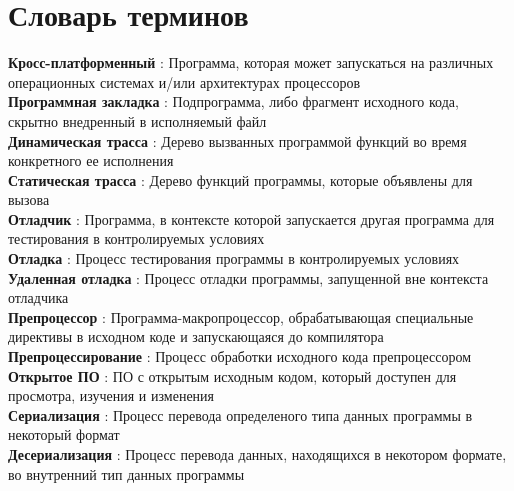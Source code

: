 \chapter*{Словарь терминов}             %

\textbf{Кросс-платформенный} : Программа, которая может запускаться на различных операционных системах и/или архитектурах процессоров \\
\textbf{Программная закладка} : Подпрограмма, либо фрагмент исходного кода, скрытно внедренный в исполняемый файл \\
\textbf{Динамическая трасса} : Дерево вызванных программой функций во время конкретного ее исполнения \\
\textbf{Статическая трасса} : Дерево функций программы, которые объявлены для вызова \\
\textbf{Отладчик} : Программа, в контексте которой запускается другая программа для тестирования в контролируемых условиях \\
\textbf{Отладка} : Процесс тестирования программы в контролируемых условиях \\
\textbf{Удаленная отладка} : Процесс отладки программы, запущенной вне контекста отладчика \\
\textbf{Препроцессор} : Программа-макропроцессор, обрабатывающая специальные директивы в исходном коде и запускающаяся до компилятора  \\
\textbf{Препроцессирование} : Процесс обработки исходного кода препроцессором \\
\textbf{Открытое ПО} : ПО с открытым исходным кодом, который доступен для просмотра, изучения и изменения \\
\textbf{Сериализация} : Процесс перевода определеного типа данных программы в некоторый формат\\
\textbf{Десериализация} : Процесс перевода данных, находящихся в некотором формате, во внутренний тип данных программы\\

